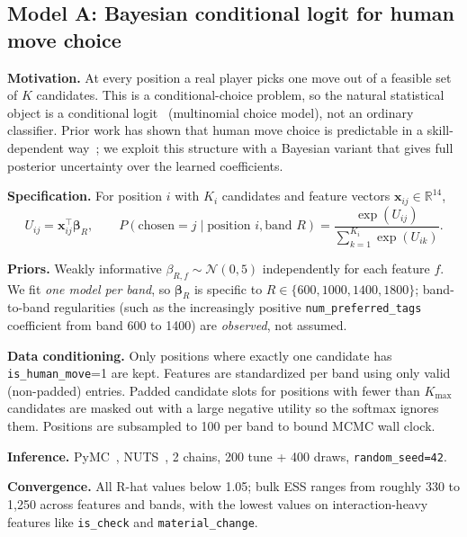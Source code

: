 \documentclass[11pt]{article}
\begin{document}
\subsection{Model A: Bayesian conditional logit for human move choice}
\textbf{Motivation.} At every position a real player picks one move out of a feasible set of $K$ candidates. This is a conditional-choice problem, so the natural statistical object is a conditional logit~\cite{mcfadden1974conditional} (multinomial choice model), not an ordinary classifier. Prior work has shown that human move choice is predictable in a skill-dependent way~\cite{mcilroy2020aligning}; we exploit this structure with a Bayesian variant that gives full posterior uncertainty over the learned coefficients.

\textbf{Specification.} For position $i$ with $K_i$ candidates and feature vectors $\mathbf{x}_{ij} \in \mathbb{R}^{14}$,
\[
U_{ij} = \mathbf{x}_{ij}^{\top}\boldsymbol{\beta}_R, \qquad
P(\text{chosen}=j \mid \text{position } i, \text{band } R) = \frac{\exp(U_{ij})}{\sum_{k=1}^{K_i} \exp(U_{ik})}.
\]

\textbf{Priors.} Weakly informative $\beta_{R,f} \sim \mathcal{N}(0,5)$ independently for each feature $f$. We fit \emph{one model per band}, so $\boldsymbol{\beta}_R$ is specific to $R \in \{600,1000,1400,1800\}$; band-to-band regularities (such as the increasingly positive \texttt{num\_preferred\_tags} coefficient from band 600 to 1400) are \emph{observed}, not assumed.

\textbf{Data conditioning.} Only positions where exactly one candidate has \texttt{is\_human\_move}=1 are kept. Features are standardized per band using only valid (non-padded) entries. Padded candidate slots for positions with fewer than $K_{\max}$ candidates are masked out with a large negative utility so the softmax ignores them. Positions are subsampled to 100 per band to bound MCMC wall clock.

\textbf{Inference.} PyMC~\cite{salvatier2016pymc}, NUTS~\cite{hoffman2014nuts}, 2 chains, 200 tune + 400 draws, \texttt{random\_seed=42}.

\textbf{Convergence.} All R-hat values below 1.05; bulk ESS ranges from roughly 330 to 1{,}250 across features and bands, with the lowest values on interaction-heavy features like \texttt{is\_check} and \texttt{material\_change}.
\end{document}

